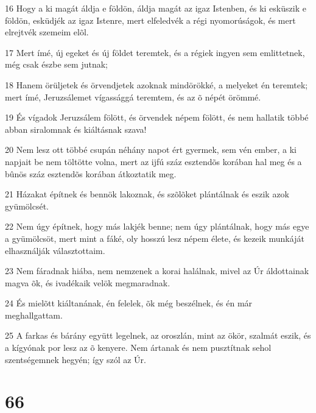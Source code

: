 \par 16 Hogy a ki magát áldja e földön, áldja magát az igaz Istenben, és ki esküszik e földön, esküdjék az igaz Istenre, mert elfeledvék a régi nyomorúságok, és mert elrejtvék szemeim elõl.
\par 17 Mert ímé, új egeket és új földet teremtek, és a régiek ingyen sem emlittetnek, még csak észbe sem jutnak;
\par 18 Hanem örüljetek és örvendjetek azoknak mindörökké, a melyeket én teremtek; mert ímé, Jeruzsálemet vígassággá teremtem, és az õ népét örömmé.
\par 19 És vígadok Jeruzsálem fölött, és örvendek népem fölött, és nem hallatik többé abban siralomnak és kiáltásnak szava!
\par 20 Nem lesz ott többé csupán néhány napot ért gyermek, sem vén ember, a ki napjait be nem töltötte volna, mert az ijfú száz esztendõs korában hal meg és a bûnös száz esztendõs korában átkoztatik meg.
\par 21 Házakat építnek és bennök lakoznak, és szõlõket plántálnak és eszik azok gyümölcsét.
\par 22 Nem úgy építnek, hogy más lakjék benne; nem úgy plántálnak, hogy más egye a gyümölcsöt, mert mint a fáké, oly hosszú lesz népem élete, és kezeik munkáját elhasználják választottaim.
\par 23 Nem fáradnak hiába, nem nemzenek a korai halálnak, mivel az Úr áldottainak magva õk, és ivadékaik velök megmaradnak.
\par 24 És mielõtt kiáltanának, én felelek, õk még beszélnek, és én már meghallgattam.
\par 25 A farkas és bárány együtt legelnek, az oroszlán, mint az ökör, szalmát eszik, és a kígyónak por lesz az õ kenyere. Nem ártanak és nem pusztítnak sehol szentségemnek hegyén; így szól az Úr.

\chapter{66}

